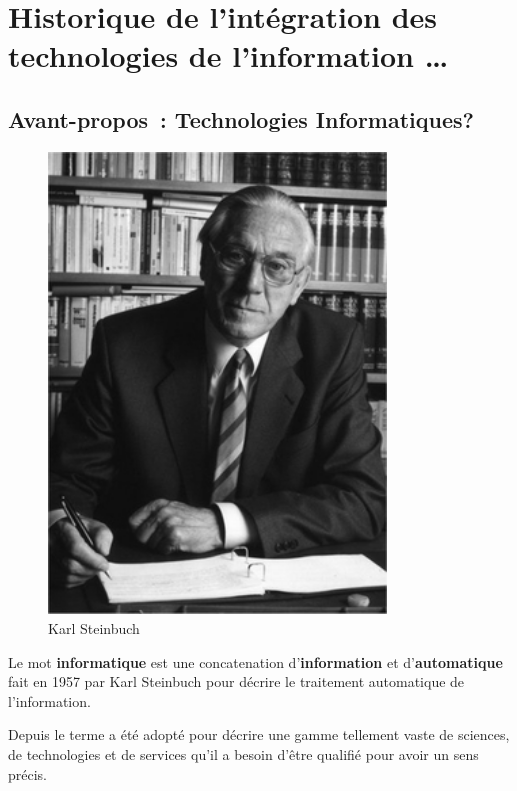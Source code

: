 
\part{Historique de l'intégration des technologies de l'information \ldots}\label{quoi}

\chapter*{Avant-propos~: Technologies Informatiques?}

\begin{minipage}[H]{0.3\linewidth}
  \begin{figure}[H]
  \centering
  \includegraphics[width=0.8\textwidth]{../resources/illustrations/steinbuch}
  \caption{Karl Steinbuch}
  \end{figure}
\end{minipage}
\begin{minipage}[H]{0.7\linewidth}
Le mot \textbf{informatique} est une concatenation d'\textbf{information} et d'\textbf{automatique} fait en 1957 par Karl Steinbuch\cite{steinbuch-2005} pour décrire le traitement automatique de l'information.

Depuis le terme a été adopté pour décrire une gamme tellement vaste de sciences, de technologies et de services qu'il a besoin d'être qualifié pour avoir un sens précis.
\vspace{1cm}
\end{minipage}

